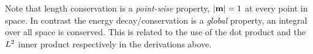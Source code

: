 Note that length conservation is a \emph{point-wise} property, \ie $\left|{\boldsymbol{\mathrm{m}}} \right| = 1$ at every point in space.
In contrast the energy decay/conservation is a \emph{global} property, \ie an integral over all space is conserved.
This is related to the use of the dot product and the ${L^2}$ inner product respectively in the derivations above.



